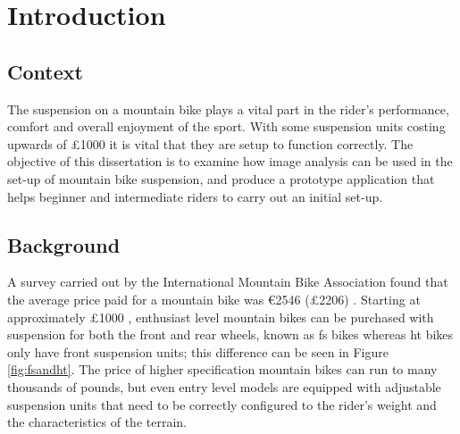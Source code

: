 \section{Introduction}\label{sec:introduction}
\subsection{Context}
	The suspension on a mountain bike plays a vital part in the rider's performance, comfort and overall enjoyment of the sport. With some suspension units costing upwards of \pounds1000 it is vital that they are setup to function correctly. The objective of this dissertation is to examine how image analysis can be used in the set-up of mountain bike suspension, and produce a prototype application that helps beginner and intermediate riders to carry out an initial set-up.
\subsection{Background}
	A survey carried out by the International Mountain Bike Association found that the average price paid for a mountain bike was \euro2546 (\pounds2206) \citep{imbasurv}. Starting at approximately \pounds1000 \citep{giantstance}, enthusiast level mountain bikes can be purchased with suspension for both the front and rear wheels, known as \gls{fs} bikes whereas \gls{ht} bikes only have front suspension units; this difference can be seen in Figure \ref{fig:fsandht}. The price of higher specification mountain bikes can run to many thousands of pounds, but even entry level models are equipped with adjustable suspension units that need to be correctly configured to the rider's weight and the characteristics of the terrain.

